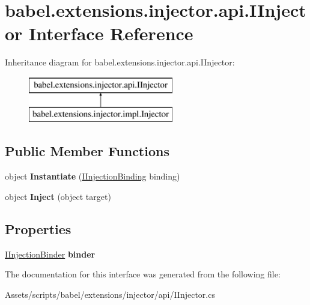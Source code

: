 \hypertarget{interfacebabel_1_1extensions_1_1injector_1_1api_1_1_i_injector}{\section{babel.\-extensions.\-injector.\-api.\-I\-Injector Interface Reference}
\label{interfacebabel_1_1extensions_1_1injector_1_1api_1_1_i_injector}
}
Inheritance diagram for babel.\-extensions.\-injector.\-api.\-I\-Injector\-:\begin{figure}[H]
\begin{center}
\leavevmode
\includegraphics[height=2.000000cm]{interfacebabel_1_1extensions_1_1injector_1_1api_1_1_i_injector}
\end{center}
\end{figure}
\subsection*{Public Member Functions}
\begin{DoxyCompactItemize}
\item 
\hypertarget{interfacebabel_1_1extensions_1_1injector_1_1api_1_1_i_injector_aebacbdb1c81893d98a1eb4f93e8e2702}{object {\bfseries Instantiate} (\hyperlink{interfacebabel_1_1extensions_1_1injector_1_1api_1_1_i_injection_binding}{I\-Injection\-Binding} binding)}\label{interfacebabel_1_1extensions_1_1injector_1_1api_1_1_i_injector_aebacbdb1c81893d98a1eb4f93e8e2702}

\item 
\hypertarget{interfacebabel_1_1extensions_1_1injector_1_1api_1_1_i_injector_a333fb6f52358cc817a3ded528e488aa8}{object {\bfseries Inject} (object target)}\label{interfacebabel_1_1extensions_1_1injector_1_1api_1_1_i_injector_a333fb6f52358cc817a3ded528e488aa8}

\end{DoxyCompactItemize}
\subsection*{Properties}
\begin{DoxyCompactItemize}
\item 
\hypertarget{interfacebabel_1_1extensions_1_1injector_1_1api_1_1_i_injector_ab4cdf184a1a130edd590714026b6edd3}{\hyperlink{interfacebabel_1_1extensions_1_1injector_1_1api_1_1_i_injection_binder}{I\-Injection\-Binder} {\bfseries binder}}\label{interfacebabel_1_1extensions_1_1injector_1_1api_1_1_i_injector_ab4cdf184a1a130edd590714026b6edd3}

\end{DoxyCompactItemize}


The documentation for this interface was generated from the following file\-:\begin{DoxyCompactItemize}
\item 
Assets/scripts/babel/extensions/injector/api/I\-Injector.\-cs\end{DoxyCompactItemize}
